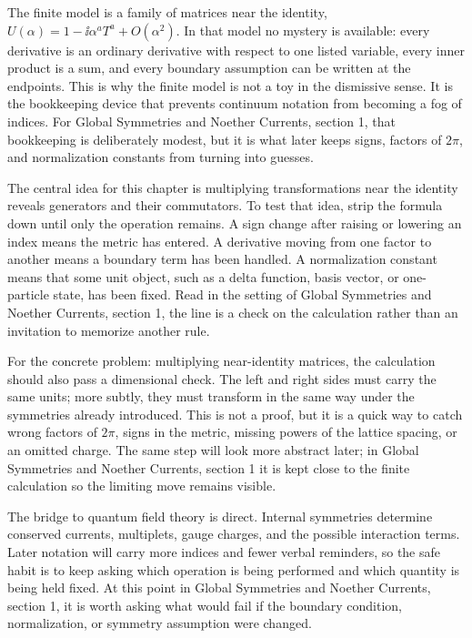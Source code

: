 The finite model is a family of matrices near the identity, \(U(\alpha)=1-\ii\alpha^aT^a+O(\alpha^2)\).  In that model no mystery is available: every derivative is an ordinary derivative with respect to one listed variable, every inner product is a sum, and every boundary assumption can be written at the endpoints.  This is why the finite model is not a toy in the dismissive sense.  It is the bookkeeping device that prevents continuum notation from becoming a fog of indices.  For Global Symmetries and Noether Currents, section 1, that bookkeeping is deliberately modest, but it is what later keeps signs, factors of \(2\pi\), and normalization constants from turning into guesses.

The central idea for this chapter is multiplying transformations near the identity reveals generators and their commutators.  To test that idea, strip the formula down until only the operation remains.  A sign change after raising or lowering an index means the metric has entered.  A derivative moving from one factor to another means a boundary term has been handled.  A normalization constant means that some unit object, such as a delta function, basis vector, or one-particle state, has been fixed.  Read in the setting of Global Symmetries and Noether Currents, section 1, the line is a check on the calculation rather than an invitation to memorize another rule.

For the concrete problem: multiplying near-identity matrices, the calculation should also pass a dimensional check.  The left and right sides must carry the same units; more subtly, they must transform in the same way under the symmetries already introduced.  This is not a proof, but it is a quick way to catch wrong factors of \(2\pi\), signs in the metric, missing powers of the lattice spacing, or an omitted charge.  The same step will look more abstract later; in Global Symmetries and Noether Currents, section 1 it is kept close to the finite calculation so the limiting move remains visible.

The bridge to quantum field theory is direct.  Internal symmetries determine conserved currents, multiplets, gauge charges, and the possible interaction terms.  Later notation will carry more indices and fewer verbal reminders, so the safe habit is to keep asking which operation is being performed and which quantity is being held fixed.  At this point in Global Symmetries and Noether Currents, section 1, it is worth asking what would fail if the boundary condition, normalization, or symmetry assumption were changed.

